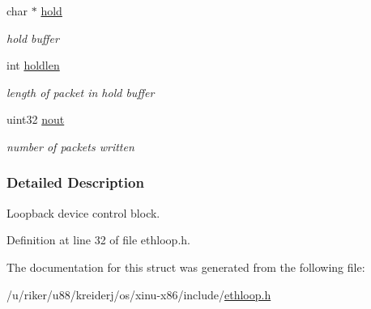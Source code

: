 \begin{DoxyCompactItemize}
\mbox{\label{structethloop_a67eb4c1f2de7fb2f97992411cc57b504}} 
char $\ast$ \hyperlink{structethloop_a67eb4c1f2de7fb2f97992411cc57b504}{hold}
\begin{DoxyCompactList}\small\item\em hold buffer \end{DoxyCompactList}\item 
\mbox{\label{structethloop_a163c6fe8a940fcb9d236b8abb9d7fd2c}} 
int \hyperlink{structethloop_a163c6fe8a940fcb9d236b8abb9d7fd2c}{holdlen}
\begin{DoxyCompactList}\small\item\em length of packet in hold buffer \end{DoxyCompactList}\item 
\mbox{\label{structethloop_aea5d1011495ce7f63b382fb04879b267}} 
uint32 \hyperlink{structethloop_aea5d1011495ce7f63b382fb04879b267}{nout}
\begin{DoxyCompactList}\small\item\em number of packets written \end{DoxyCompactList}\end{DoxyCompactItemize}


\subsubsection{Detailed Description}
Loopback device control block. 

Definition at line 32 of file ethloop.\+h.



The documentation for this struct was generated from the following file\+:\begin{DoxyCompactItemize}
\item 
/u/riker/u88/kreiderj/os/xinu-\/x86/include/\hyperlink{ethloop_8h}{ethloop.\+h}\end{DoxyCompactItemize}
